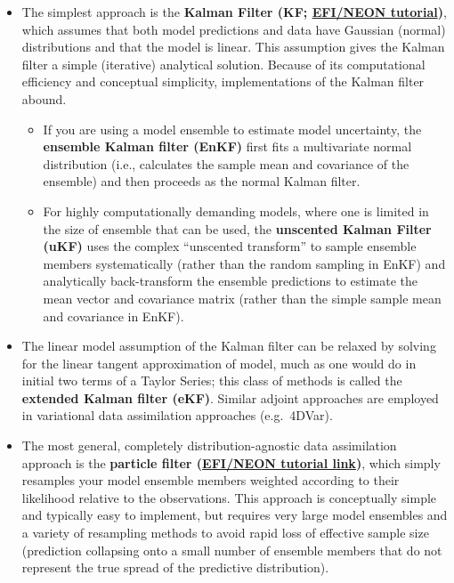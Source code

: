 \documentclass[
]{book}
\providecommand{\tightlist}{%
  \setlength{\itemsep}{0pt}\setlength{\parskip}{0pt}}
\begin{document}
\begin{itemize}
\item
  The simplest approach is the \textbf{Kalman Filter (KF; \href{https://github.com/EcoForecast/EF_Activities/blob/master/Exercise_09_KalmanFilter.Rmd}{EFI/NEON tutorial})}, which assumes that both model predictions and data have Gaussian (normal) distributions and that the model is linear. This assumption gives the Kalman filter a simple (iterative) analytical solution. Because of its computational efficiency and conceptual simplicity, implementations of the Kalman filter abound.

  \begin{itemize}
  \tightlist
  \item
    If you are using a model ensemble to estimate model uncertainty, the \textbf{ensemble Kalman filter (EnKF)} first fits a multivariate normal distribution (i.e., calculates the sample mean and covariance of the ensemble) and then proceeds as the normal Kalman filter.
  \item
    For highly computationally demanding models, where one is limited in the size of ensemble that can be used, the \textbf{unscented Kalman Filter (uKF)} uses the complex ``unscented transform'' to sample ensemble members systematically (rather than the random sampling in EnKF) and analytically back-transform the ensemble predictions to estimate the mean vector and covariance matrix (rather than the simple sample mean and covariance in EnKF).
  \end{itemize}
\item
  The linear model assumption of the Kalman filter can be relaxed by solving for the linear tangent approximation of model, much as one would do in initial two terms of a Taylor Series; this class of methods is called the \textbf{extended Kalman filter (eKF)}. Similar adjoint approaches are employed in variational data assimilation approaches (e.g.~4DVar).
\item
  The most general, completely distribution-agnostic data assimilation approach is the \textbf{particle filter (\href{https://github.com/EcoForecast/EF_Activities/blob/master/Exercise_10_ParticleFilter.Rmd}{EFI/NEON tutorial link})}, which simply resamples your model ensemble members weighted according to their likelihood relative to the observations. This approach is conceptually simple and typically easy to implement, but requires very large model ensembles and a variety of resampling methods to avoid rapid loss of effective sample size (prediction collapsing onto a small number of ensemble members that do not represent the true spread of the predictive distribution).

\end{itemize}
\end{document}
